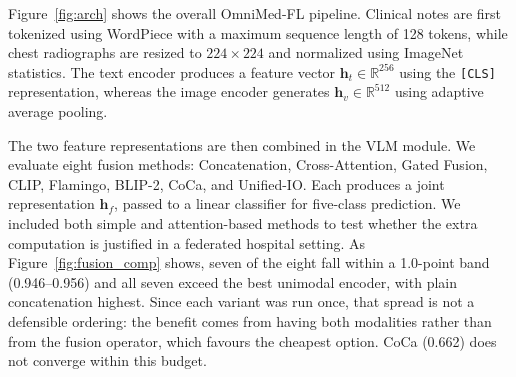 \documentclass[letterpaper, conference]{IEEEtran}
\begin{document}
Figure~\ref{fig:arch} shows the overall OmniMed-FL pipeline. Clinical notes are first tokenized using WordPiece with a maximum sequence length of 128 tokens, while chest radiographs are resized to $224{\times}224$ and normalized using ImageNet statistics. The text encoder produces a feature vector $\mathbf{h}_t\!\in\!\mathbb{R}^{256}$ using the \texttt{[CLS]} representation, whereas the image encoder generates $\mathbf{h}_v\!\in\!\mathbb{R}^{512}$ using adaptive average pooling.

The two feature representations are then combined in the VLM module. We evaluate
eight fusion methods: Concatenation, Cross-Attention, Gated Fusion, CLIP,
Flamingo, BLIP-2, CoCa, and Unified-IO. Each produces a joint representation
$\mathbf{h}_f$, passed to a linear classifier for five-class prediction. We
included both simple and attention-based methods to test whether the extra
computation is justified in a federated hospital setting. As
Figure~\ref{fig:fusion_comp} shows, seven of the eight fall within a 1.0-point
band (0.946--0.956) and all seven exceed the best unimodal encoder, with plain
concatenation highest. Since each variant was run once, that spread is not a
defensible ordering: the benefit comes from having both modalities rather than
from the fusion operator, which favours the cheapest option. CoCa (0.662) does
not converge within this budget.


\end{document}

